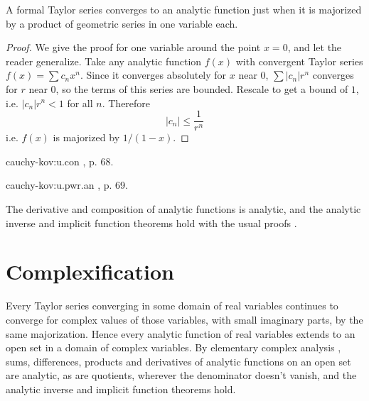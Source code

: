 \begin{lemma}\label{lemma:cauchy:convergent.Taylor}
A formal Taylor series converges to an analytic function just when it is majorized by a product of geometric series in one variable each.
\end{lemma}
\begin{proof}
We give the proof for one variable around the point \(x=0\), and let the reader generalize.
Take any analytic function \(f(x)\) with convergent Taylor series \(f(x)=\sum c_n x^n\).
Since it converges absolutely for \(x\) near \(0\), \(\sum \left|c_n\right| r^n\) converges for \(r\) near \(0\), so the terms of this series are bounded.
Rescale to get a bound of \(1\), i.e. \(\left|c_n\right| r^n < 1\) for all \(n\).
Therefore 
\[
\left|c_n\right| \le \frac{1}{r^n}
\]
i.e. \(f(x)\) is majorized by \(1/(1-x)\).
\end{proof}
\begin{answer}{cauchy-kov:u.con}
\cite{Serre:2006}, p. 68. 
\end{answer}
\begin{answer}{cauchy-kov:u.pwr.an}
\cite{Serre:2006}, p. 69. 
\end{answer}
The derivative and composition of analytic functions is analytic, and the analytic inverse and implicit function theorems hold with the usual proofs \cite{Krantz/Parks:2002,Serre:2006}.

\section{Complexification}
Every Taylor series converging in some domain of real variables continues to converge for complex values of those variables, with small imaginary parts, by the same majorization.
Hence every analytic function of real variables extends to an open set in a domain of complex variables.
By elementary complex analysis \cite{Ahlfors:1978}, sums, differences, products and derivatives of analytic functions on an open set are analytic, as are quotients, wherever the denominator doesn't vanish, and the analytic inverse and implicit function theorems hold.

